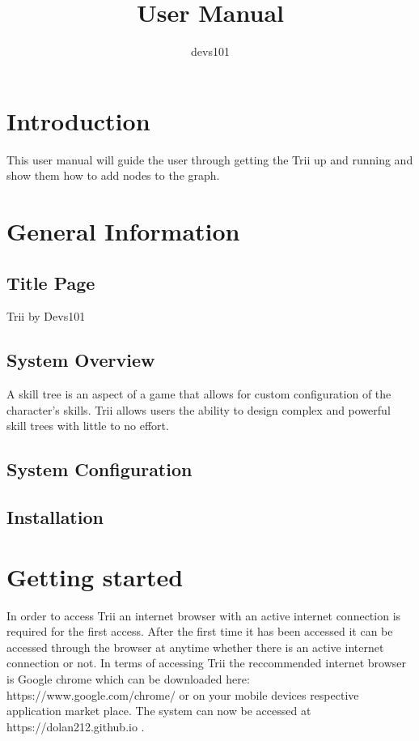 \documentclass{article}
\title{User Manual}
\author{devs101}
\begin{document}
\maketitle
\tableofcontents
\newpage

\section{Introduction}
This user manual will guide the user through getting the Trii up and running and show them how to add nodes to the graph.
\section{General Information}
\subsection{Title Page}
Trii by Devs101
\subsection{System Overview}
A skill tree is an aspect of a game that allows for custom configuration of the character's skills. Trii allows users the ability to design complex and powerful skill trees with little to no effort.
\subsection{System Configuration}
\subsection{Installation}

\section{Getting started}
In order to access Trii an internet browser with an active internet connection is required for the first access. After the first time it has been accessed it can be accessed through the browser at anytime whether there is an active internet connection or not. In terms of accessing Trii the reccommended internet browser is Google chrome which can be downloaded here: https://www.google.com/chrome/ or on your mobile devices respective application market place. The system can now be accessed at https://dolan212.github.io .
\end{document}
